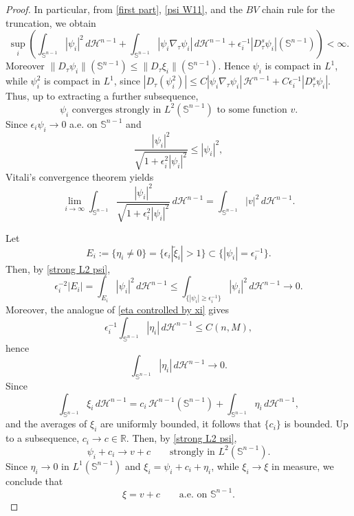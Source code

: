 \documentclass[reqno,11pt]{amsart}
\def\ez{\epsilon}
\newcommand{\HH}{\mathscr H}
\numberwithin{equation}{section}
\theoremstyle{remark}
\begin{document}
\begin{proof}
In particular, from \eqref{first part}, \eqref{psi W11}, and the $BV$ chain
rule for the truncation, we obtain
$$
\sup_i \left(
\int_{\mathbb S^{n-1}} |\psi_i|^2\,d\mathscr H^{n-1}
+
\int_{\mathbb S^{n-1}} |\psi_i\nabla_\tau \psi_i|\,d\mathscr H^{n-1}
+\epsilon_i^{-1}|D^s_\tau\psi_i|(\mathbb S^{n-1})
\right)<\infty.
$$
Moreover $\|D_\tau\psi_i\|(\mathbb S^{n-1})\le
\|D_\tau\xi_i\|(\mathbb S^{n-1})$. Hence $\psi_i$ is compact in $L^1$, while
$\psi_i^2$ is compact in $L^1$, since
$|D_\tau(\psi_i^2)|\le C|\psi_i\nabla_\tau\psi_i|\,\HH^{n-1}
+C\epsilon_i^{-1}|D^s_\tau\psi_i|$. Thus, up to extracting a further subsequence,
\begin{equation}\label{strong L2 psi}
\text{$\psi_i$ converges strongly in $L^2(\mathbb S^{n-1})$ to some function $v$.}
\end{equation}
Since $\epsilon_i\psi_i\to 0$ a.e. on $\mathbb S^{n-1}$ and
$$\frac{|\psi_i|^2}{\sqrt{1+\ez_i^2|\psi_i|^2}}\le |\psi_i|^2, $$
Vitali's convergence theorem yields
\begin{equation}\label{strong L2 psi2}
\lim_{i\to \infty}\int_{\mathbb S^{n-1}}  \frac{|\psi_i|^2}{\sqrt{1+\ez_i^2|\psi_i|^2}} \,d\mathscr H^{n-1}=  \int_{\mathbb S^{n-1}} {|v|^2}  \,d\mathscr H^{n-1}.
\end{equation}

Let
$$
E_i:=\{\eta_i\neq 0\}=\{\epsilon_i|\tilde\xi_i|>1\}\subset \{|\psi_i|=\epsilon_i^{-1}\}.
$$
Then, by \eqref{strong L2 psi},
\begin{equation}\label{measure to 0}
\epsilon_i^{-2}|E_i|
=
\int_{E_i} |\psi_i|^2\,d\mathscr H^{n-1}
\le
\int_{\{|\psi_i|\ge \epsilon_i^{-1}\}} |\psi_i|^2\,d\mathscr H^{n-1}
\longrightarrow 0.
\end{equation}
Moreover, the analogue of \eqref{eta controlled by xi} gives
$$
\epsilon_i^{-1}\int_{\mathbb S^{n-1}}|\eta_i|\,d\mathscr H^{n-1}\le C(n,M),
$$
hence
$$
\int_{\mathbb S^{n-1}}|\eta_i|\,d\mathscr H^{n-1}\to 0.
$$
Since
$$
\int_{\mathbb S^{n-1}}\xi_i\,d\mathscr H^{n-1}
=
c_i\,\mathscr H^{n-1}(\mathbb S^{n-1})+\int_{\mathbb S^{n-1}}\eta_i\,d\mathscr H^{n-1},
$$
and the averages of $\xi_i$ are uniformly bounded, it follows that $\{c_i\}$ is bounded. Up to a subsequence,
$
c_i\to c\in\mathbb R.
$
Then, by \eqref{strong L2 psi},
$$
\psi_i+c_i \to v+c \qquad\text{strongly in }L^2(\mathbb S^{n-1}).
$$
Since $\eta_i\to 0$ in $L^1(\mathbb S^{n-1})$ and $\xi_i=\psi_i+c_i+\eta_i$, while $\xi_i\to\xi$ in measure, we conclude that
$$
\xi=v+c \qquad\text{a.e. on }\mathbb S^{n-1}.
$$


\end{proof}
\end{document}
